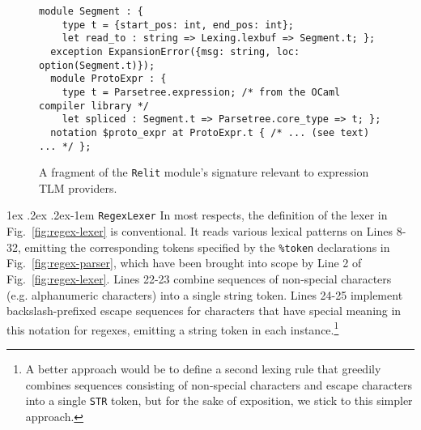\documentclass[acmsmall,screen]{acmart}
\makeatletter
\renewcommand{\subsubsection}{%
  \@startsection{subsubsection}{3}%
  {\z@}{1ex \@plus .2ex \@minus .2ex}{-1em}%
  {\sffamily\normalsize\itshape\maybe@addperiod}%
}
\newcommand{\maybe@addperiod}[1]{%
  #1\@addpunct{.}%
}
\newcommand{\li}[1]{\lstinline[basicstyle=\ttfamily\fontsize{9pt}{1em}\selectfont]{#1}}
\makeatother
\begin{document}
\begin{figure}
\begin{lstlisting}[deletekeywords={spliced}]
  module Segment : { 
    type t = {start_pos: int, end_pos: int};
    let read_to : string => Lexing.lexbuf => Segment.t; };
  exception ExpansionError({msg: string, loc: option(Segment.t)});
  module ProtoExpr : { 
    type t = Parsetree.expression; /* from the OCaml compiler library */
    let spliced : Segment.t => Parsetree.core_type => t; };
  notation $proto_expr at ProtoExpr.t { /* ... (see text) ... */ };
\end{lstlisting}
\vspace{-2px}
\caption{A fragment of the \li{Relit} module's signature relevant to expression TLM providers.}
\label{fig:relit-util}
\vspace{-5px}
\end{figure}

\subsubsection{\li{RegexLexer}}
\label{sec:regex-lexer}
In most respects, the definition of the lexer in Fig.~\ref{fig:regex-lexer} is conventional. It reads various lexical patterns on Lines 8-32, emitting the corresponding tokens specified by the \lstinline[morekeywords={token}]{%token} declarations in Fig.~\ref{fig:regex-parser}, which have been brought into scope by Line 2 of Fig.~\ref{fig:regex-lexer}. Lines 22-23 combine sequences of non-special characters (e.g. alphanumeric characters) into a single string token. Lines 24-25 implement backslash-prefixed escape sequences for characters that have special meaning in this notation for regexes, emitting a string token in each instance.\footnote{A better approach would be to define a second lexing rule that greedily combines sequences consisting of non-special characters and escape characters into a single \li{STR} token, but for the sake of exposition, we stick to this simpler approach.}  
\end{document}
